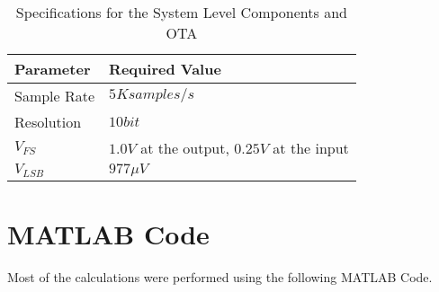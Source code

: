 \documentclass{article}
\begin{document}
\begin{table}[h]
\centering
{}
\begin{tabularx}{500pt}{|R|R|}
\hline
\textbf{Parameter}&\textbf{Required Value}\\ \hline
Sample Rate&$5K samples/s$\\ \hline
Resolution&$10bit$\\ \hline
$V_{FS}$&$1.0V$ at the output, $0.25V$ at the input\\ \hline
$V_{LSB}$& $977\mu V$\\ \hline
\end{tabularx}
\caption{Specifications for the System Level Components and OTA}
\label{b11_errors}
\end{table}

\clearpage
\section{MATLAB Code}
Most of the calculations were performed using the following MATLAB Code.

\end{document}

